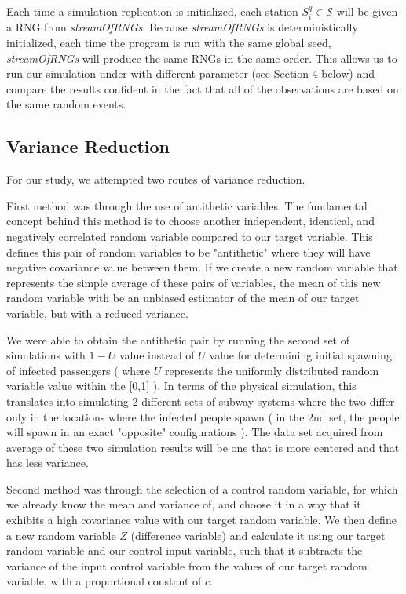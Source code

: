 \documentclass[12pt]{article}
\begin{document}
Each time a simulation replication is initialized, each station $S_i^q \in \mathcal{S}$ will be given a RNG from \emph{streamOfRNGs}.
Because \emph{streamOfRNGs} is deterministically initialized, each time the program is run with the same global seed, \emph{streamOfRNGs} will produce the same RNGs in the same order.
This allows us to run our simulation under with different parameter (see Section 4 below) and compare the results confident in the fact that all of the observations are based on the same random events.

\subsection{Variance Reduction}

For our study, we attempted two routes of variance reduction.

First method was through the use of antithetic variables. The fundamental concept behind this method is to choose another independent, identical, and negatively correlated random variable compared to our target variable. This defines this pair of random variables to be "antithetic" where they will have negative covariance value between them. If we create a new random variable that represents the simple average of these pairs of variables, the mean of this new random variable with be an unbiased estimator of the mean of our target variable, but with a reduced variance.

We were able to obtain the antithetic pair by running the second set of simulations with $1-U$ value instead of $U$ value for determining initial spawning of infected passengers ( where $U$ represents the uniformly distributed random variable value within the [0,1] ). In terms of the physical simulation, this translates into simulating 2 different sets of subway systems where the two differ only in the locations where the infected people spawn ( in the 2nd set, the people will spawn in an exact "opposite" configurations ). The data set acquired from average of these two simulation results will be one that is more centered and that has less variance.

Second method was through the selection of a control random variable, for which we already know the mean and variance of, and choose it in a way that it exhibits a high covariance value with our target random variable. We then define a new random variable $Z$ (difference variable) and calculate it using our target random variable and our control input variable, such that it subtracts the variance of the input control variable from the values of our target random variable, with a proportional constant of $c$.
\end{document}

